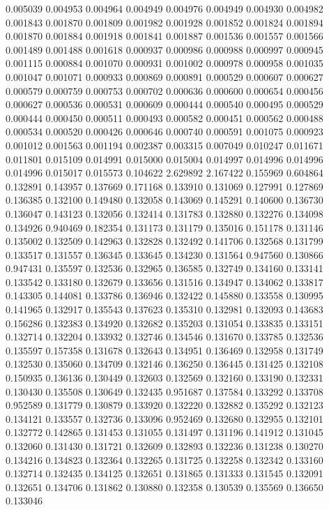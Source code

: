 0.005039
0.004953
0.004964
0.004949
0.004976
0.004949
0.004930
0.004982
0.001843
0.001870
0.001809
0.001982
0.001928
0.001852
0.001824
0.001894
0.001870
0.001884
0.001918
0.001841
0.001887
0.001536
0.001557
0.001566
0.001489
0.001488
0.001618
0.000937
0.000986
0.000988
0.000997
0.000945
0.001115
0.000884
0.001070
0.000931
0.001002
0.000978
0.000958
0.001035
0.001047
0.001071
0.000933
0.000869
0.000891
0.000529
0.000607
0.000627
0.000579
0.000759
0.000753
0.000702
0.000636
0.000600
0.000654
0.000456
0.000627
0.000536
0.000531
0.000609
0.000444
0.000540
0.000495
0.000529
0.000444
0.000450
0.000511
0.000493
0.000582
0.000451
0.000562
0.000488
0.000534
0.000520
0.000426
0.000646
0.000740
0.000591
0.001075
0.000923
0.001012
0.001563
0.001194
0.002387
0.003315
0.007049
0.010247
0.011671
0.011801
0.015109
0.014991
0.015000
0.015004
0.014997
0.014996
0.014996
0.014996
0.015017
0.015573
0.104622
2.629892
2.167422
0.155969
0.604864
0.132891
0.143957
0.137669
0.171168
0.133910
0.131069
0.127991
0.127869
0.136385
0.132100
0.149480
0.132058
0.143069
0.145291
0.140600
0.136730
0.136047
0.143123
0.132056
0.132414
0.131783
0.132880
0.132276
0.134098
0.134926
0.940469
0.182354
0.131173
0.131179
0.135016
0.151178
0.131146
0.135002
0.132509
0.142963
0.132828
0.132492
0.141706
0.132568
0.131799
0.133517
0.131557
0.136345
0.133645
0.134230
0.131564
0.947560
0.130866
0.947431
0.135597
0.132536
0.132965
0.136585
0.132749
0.134160
0.133141
0.133542
0.133180
0.132679
0.133656
0.131516
0.134947
0.134062
0.133817
0.143305
0.144081
0.133786
0.136946
0.132422
0.145880
0.133558
0.130995
0.141965
0.132917
0.135543
0.137623
0.135310
0.132981
0.132093
0.143683
0.156286
0.132383
0.134920
0.132682
0.135203
0.131054
0.133835
0.133151
0.132714
0.132204
0.133932
0.132746
0.134546
0.131670
0.133785
0.132536
0.135597
0.157358
0.131678
0.132643
0.134951
0.136469
0.132958
0.131749
0.132530
0.135060
0.134709
0.132146
0.136250
0.136445
0.131425
0.132108
0.150935
0.136136
0.130449
0.132603
0.132569
0.132160
0.133190
0.132331
0.130430
0.135508
0.130649
0.132435
0.951687
0.137584
0.133292
0.133708
0.952589
0.131779
0.130879
0.133920
0.132220
0.132882
0.135292
0.132123
0.134121
0.133557
0.132736
0.133096
0.952469
0.132680
0.132955
0.132101
0.132772
0.142865
0.131453
0.131055
0.131497
0.131196
0.141912
0.131045
0.132060
0.131430
0.131721
0.132609
0.132893
0.132236
0.131238
0.130270
0.134216
0.134823
0.132364
0.132265
0.131725
0.132258
0.132342
0.133160
0.132714
0.132435
0.134125
0.132651
0.131865
0.131333
0.131545
0.132091
0.132651
0.134706
0.131862
0.130880
0.132358
0.130539
0.135569
0.136650
0.133046

